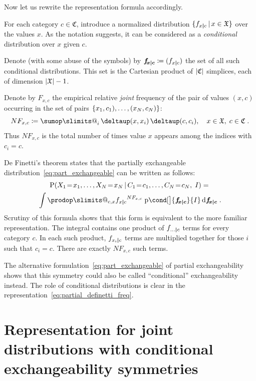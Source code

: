 \documentclass[\ifafour a4paper,12pt,\else a5paper,10pt,\fi%
onecolumn,oneside,article,%
british%
]{memoir}
\makeatletter
\theoremstyle{remark}
\theoremstyle{innote}
\def\sum{\DOTSI\sumop\slimits@}
\def\prod{\DOTSI\prodop\slimits@}
\newcommand*{\delt}{\deltaup}%
\newcommand*{\di}{\mathrm{d}}%
\newcommand*{\defd}{\coloneqq}
\DeclarePairedDelimiter\abs{\lvert}{\rvert}
\DeclarePairedDelimiter\set{\{}{\}}
\newcommand*{\pf}{\mathrm{p}}%
\newcommand*{\p}{\mathrm{P}}%
\renewcommand*{\|}[1][]{\nonscript\,#1\vert\nonscript\,\mathopen{}}
\newcommand*{\tsum}{\mathop{\textstyle\sum}\nolimits}
\renewcommand*{\=}{\TextOrMath\texteq\eq}
\newcommand*{\X}[1]{X_{#1}}
\newcommand*{\x}[1]{x_{#1}}
\newcommand*{\C}[1]{C_{#1}}
\newcommand*{\cc}[1]{c_{#1}}
\newcommand*{\sX}{\mathfrak{X}}
\newcommand*{\sC}{\mathfrak{C}}
\newcommand*{\fxc}{\bm{f_{\!x\bcond c}}}
\newcommand*{\bcond}[1][]{\nonscript\,#1\bm{\vert}\nonscript\;\mathopen{}}
\makeatother
\begin{document}
Now let us rewrite the representation formula accordingly.


For each category $c \in \sC$, introduce a normalized distribution
$\set{f_{x \bcond c} \| x \in \sX}$ over the values $x$. As the notation
suggests, it can be considered as a \emph{conditional} distribution over
$x$ given $c$.

Denote (with some abuse of the symbols) by $\fxc \defd (f_{x \bcond c})$ the
set of all such conditional distributions. This set is the Cartesian
product of $\abs{\sC}$ simplices, each of dimension $\abs{\sX}-1$.

Denote by $F_{x,c}$ the empirical relative \emph{joint} frequency of the
pair of values $(x,c)$ occurring in the set of pairs
$\set{\x{1}, \cc{1}), \dotsc, (\x{N}, \cc{N})}$:
\begin{equation}
  \label{eq:rel_frequencies}
  N F_{x,c} \defd \tsum_{i}\delt(x, \x{i})\,\delt(c, \cc{i}),
  \quad x \in \sX,\; c \in \sC \;.
\end{equation}
Thus $N F_{x,c}$ is the total number of times value $x$ appears among the
indices with $\cc{i}=c$.

De Finetti’s theorem states that the partially exchangeable
distribution~\eqref{eq:part_exchangeable} can be written as follows:
\begin{multline}
  \label{eq:partial_definetti_freq}
    \p( \X{1}\=\x{1}, \dotsc,  \X{N}\=\x{N} \|
    \C{1}\=\cc{1}, \dotsc,\C{N}\=\cc{N},\;  I) ={}\\
\int\prod_{c,x} {f_{x \bcond c}}^{N F_{x, c}}\;
\pf\cond[\big]{\fxc}{I} \,\di\fxc \;.
\end{multline}
Scrutiny of this formula shows that this form is equivalent to the more
familiar representation. The integral contains one product of
$f_{\dotso \bcond c}$ terms for every category $c$. In each such product,
$f_{\x{i} \bcond c}$ terms are multiplied together for those $i$ such that
$\cc{i}=c$. There are exactly $N F_{x,c}$ such terms.



The alternative formulation~\eqref{eq:part_exchangeable} of partial
exchangeability shows that this symmetry could also be called
\enquote{conditional} exchangeability instead. The role of conditional
distributions is clear in the
representation~\eqref{eq:partial_definetti_freq}.


\section{Representation for joint distributions with conditional
exchangeability  symmetries}
\label{sec:result}
\end{document}
